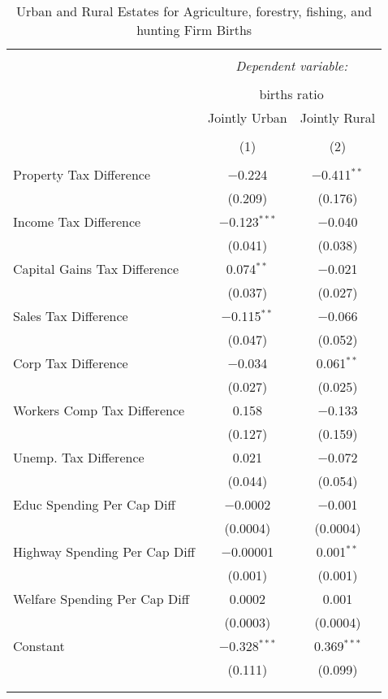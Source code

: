 
\begin{table}[!htbp] \centering 
  \caption{Urban and Rural Estates for  Agriculture, forestry, fishing, and hunting Firm Births} 
  \label{} 
\begin{tabular}{@{\extracolsep{5pt}}lcc} 
\\[-1.8ex]\hline 
\hline \\[-1.8ex] 
 & \multicolumn{2}{c}{\textit{Dependent variable:}} \\ 
\cline{2-3} 
\\[-1.8ex] & \multicolumn{2}{c}{births ratio} \\ 
 & Jointly Urban & Jointly Rural \\ 
\\[-1.8ex] & (1) & (2)\\ 
\hline \\[-1.8ex] 
 Property Tax Difference & $-$0.224 & $-$0.411$^{**}$ \\ 
  & (0.209) & (0.176) \\ 
  Income Tax Difference & $-$0.123$^{***}$ & $-$0.040 \\ 
  & (0.041) & (0.038) \\ 
  Capital Gains Tax Difference & 0.074$^{**}$ & $-$0.021 \\ 
  & (0.037) & (0.027) \\ 
  Sales Tax Difference & $-$0.115$^{**}$ & $-$0.066 \\ 
  & (0.047) & (0.052) \\ 
  Corp Tax Difference & $-$0.034 & 0.061$^{**}$ \\ 
  & (0.027) & (0.025) \\ 
  Workers Comp Tax Difference & 0.158 & $-$0.133 \\ 
  & (0.127) & (0.159) \\ 
  Unemp. Tax Difference & 0.021 & $-$0.072 \\ 
  & (0.044) & (0.054) \\ 
  Educ Spending Per Cap Diff & $-$0.0002 & $-$0.001 \\ 
  & (0.0004) & (0.0004) \\ 
  Highway Spending Per Cap Diff & $-$0.00001 & 0.001$^{**}$ \\ 
  & (0.001) & (0.001) \\ 
  Welfare Spending Per Cap Diff & 0.0002 & 0.001 \\ 
  & (0.0003) & (0.0004) \\ 
  Constant & $-$0.328$^{***}$ & 0.369$^{***}$ \\ 
  & (0.111) & (0.099) \\ 
 \hline \\[-1.8ex] 
\hline 
\hline \\[-1.8ex] 
\end{tabular} 
\end{table} 

